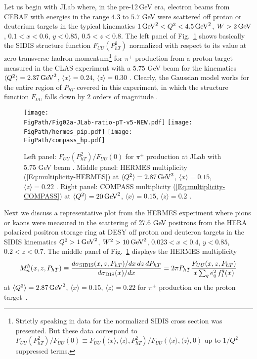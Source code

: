 \documentclass[a4paper,11pt]{article}
\newcommand{\be}{\begin{equation}}
\newcommand{\ee}{\end{equation}}
\newcommand{\la}{\langle}
\newcommand{\ra}{\rangle}
\def\Phperp{P_{hT}}
\newcommand*{\FigPath}{./figs}%
\begin{document}
Let us begin with JLab where, in the pre-12$\,$GeV era, electron beams
from CEBAF with energies in the range $4.3$ to $5.7$ GeV were scattered
off proton or deuterium targets in the typical kinematics
$1 \,{\rm GeV}^2 < Q^2 < 4.5 \,{\rm GeV}^2$, $W > 2\,{\rm GeV}$,
$0.1 < x < 0.6$, $y < 0.85$, $0.5<z<0.8$.
The left panel of Fig.~\ref{FUU-show-pT-dependence} shows basically
the SIDIS structure function $F_{UU}(P_{hT}^2)$ normalized with respect
to its value at zero transverse hadron momentum\footnote{Strictly
	speaking in \cite{Osipenko:2008aa} data for the normalized
	SIDIS cross section was presented. But these data correspond
	to $F_{UU}(P_{hT}^2)/F_{UU}(0) \equiv
	F_{UU}(\la x\ra,\la z\ra,P_{hT}^2)/F_{UU}(\la x\ra,\la z\ra,0)$
	up to $1/Q^2$-suppressed terms.}
for $\pi^+$ production from a proton target measured in the CLAS experiment
with a $5.75$ GeV beam for the kinematics $\la Q^2\ra=2.37\,{\rm GeV}^2$,
$\la x\ra=0.24$, $\la z\ra=0.30$ \cite{Osipenko:2008aa}. Clearly, the
Gaussian model works for the entire region of $P_{hT}$ covered in this
experiment, in which the structure function $F_{UU}$ falls down by 2 orders of
magnitude \cite{Schweitzer:2010tt}.

\begin{figure}[t!]
\centering
\texttt{[image: \\FigPath/Fig02a-JLab-ratio-pT-v5-NEW.pdf]}  \quad
\texttt{[image: \\FigPath/hermes\_pip.pdf]} \quad
\texttt{[image: \\FigPath/compass\_hp.pdf]}
\caption{\label{FUU-show-pT-dependence}
Left panel:
	$F_{UU}(P_{hT}^2)/F_{UU}(0)$ for $\pi^+$
	production
	at JLab with 5.75 GeV beam \cite{Osipenko:2008aa}.
Middle panel:
	HERMES multiplicity (\ref{Eq:multiplicity-HERMES}) at
	$\la Q^2\ra=2.87\,{\rm GeV}^2$, $\la x\ra  =0.15$, $\la z\ra  =0.22$
	 \cite{Airapetian:2012ki}.
Right panel:
	COMPASS multiplicity (\ref{Eq:multiplicity-COMPASS}) at
	$\la Q^2\ra=20\,{\rm GeV}^2$, $\la x\ra  =0.15$, $\la z\ra  =0.2$
	 \cite{Aghasyan:2017ctw}.}
\end{figure}

Next we discuss a representative plot from the HERMES experiment
where pions or kaons were measured in the scattering of 27.6 GeV
positrons from the HERA polarized positron storage ring at DESY
off proton and deuteron targets in the SIDIS kinematics
$Q^2 > 1 \,{\rm GeV}^2$, $W^{2} > 10\,{\rm GeV}^{2}$,
$0.023 < x < 0.4$, $y < 0.85$, $0.2<z<0.7$.
The middle panel of Fig.~\ref{FUU-show-pT-dependence} displays the
HERMES multiplicity~\cite{Airapetian:2012ki}
\be\label{Eq:multiplicity-HERMES}
	M_n^h(x,z,\Phperp) \equiv
	\frac{d\sigma_{\rm SIDIS}(x,z,\Phperp)/dx\,dz\,d\Phperp}
	{d\sigma_{\rm DIS}(x)/dx} =
	2 \pi \Phperp \frac{F_{UU}(x,z,\Phperp) }{ x \sum_q e_q^2\,f^q_1(x)}
\ee
at $\la Q^2\ra=2.87\,{\rm GeV}^2$, $\la x\ra=0.15$, $\la z\ra=0.22$
for $\pi^+$ production on the proton target~\cite{Airapetian:2012ki}.
\end{document}

